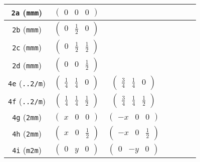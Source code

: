 \documentclass[fleqn,9pt,landscape]{jsarticle}
\begin{document}
\begin{center}
\begin{longtable}{ccccccc}
{\tt 2a} ({\tt mmm}) & $ \begin{pmatrix} 0 & 0 & 0 \end{pmatrix} $ & $  $ & $  $ & $  $ & $  $ & $  $ \\ \hline
{\tt 2b} ({\tt mmm}) & $ \begin{pmatrix} 0 & \frac{1}{2} & 0 \end{pmatrix} $ & $  $ & $  $ & $  $ & $  $ & $  $ \\ \hline
{\tt 2c} ({\tt mmm}) & $ \begin{pmatrix} 0 & \frac{1}{2} & \frac{1}{2} \end{pmatrix} $ & $  $ & $  $ & $  $ & $  $ & $  $ \\ \hline
{\tt 2d} ({\tt mmm}) & $ \begin{pmatrix} 0 & 0 & \frac{1}{2} \end{pmatrix} $ & $  $ & $  $ & $  $ & $  $ & $  $ \\ \hline
{\tt 4e} ({\tt ..2/m}) & $ \begin{pmatrix} \frac{1}{4} & \frac{1}{4} & 0 \end{pmatrix} $ & $ \begin{pmatrix} \frac{3}{4} & \frac{1}{4} & 0 \end{pmatrix} $ & $  $ & $  $ & $  $ & $  $ \\ \hline
{\tt 4f} ({\tt ..2/m}) & $ \begin{pmatrix} \frac{1}{4} & \frac{1}{4} & \frac{1}{2} \end{pmatrix} $ & $ \begin{pmatrix} \frac{3}{4} & \frac{1}{4} & \frac{1}{2} \end{pmatrix} $ & $  $ & $  $ & $  $ & $  $ \\ \hline
{\tt 4g} ({\tt 2mm}) & $ \begin{pmatrix} x & 0 & 0 \end{pmatrix} $ & $ \begin{pmatrix} - x & 0 & 0 \end{pmatrix} $ & $  $ & $  $ & $  $ & $  $ \\ \hline
{\tt 4h} ({\tt 2mm}) & $ \begin{pmatrix} x & 0 & \frac{1}{2} \end{pmatrix} $ & $ \begin{pmatrix} - x & 0 & \frac{1}{2} \end{pmatrix} $ & $  $ & $  $ & $  $ & $  $ \\ \hline
{\tt 4i} ({\tt m2m}) & $ \begin{pmatrix} 0 & y & 0 \end{pmatrix} $ & $ \begin{pmatrix} 0 & - y & 0 \end{pmatrix} $ & $  $ & $  $ & $  $ & $  $ \\ \hline

\end{longtable}
\end{center}
\end{document}
